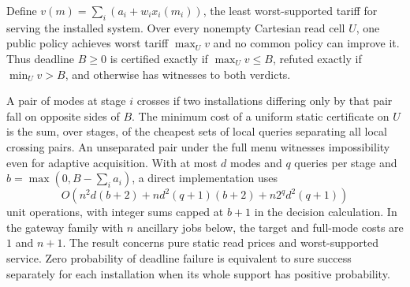 \begin{theorem}\label{ext:t30s}

Define \(v(m)=\sum_i(a_i+w_ix_i(m_i))\), the least worst-supported tariff for serving the installed system. Over every nonempty Cartesian read cell \(U\), one public policy achieves worst tariff \(\max_Uv\) and no common policy can improve it. Thus deadline \(B\ge0\) is certified exactly if \(\max_Uv\le B\), refuted exactly if \(\min_Uv>B\), and otherwise has witnesses to both verdicts.

A pair of modes at stage \(i\) crosses if two installations differing only by that pair fall on opposite sides of \(B\). The minimum cost of a uniform static certificate on \(U\) is the sum, over stages, of the cheapest sets of local queries separating all local crossing pairs. An unseparated pair under the full menu witnesses impossibility even for adaptive acquisition. With at most \(d\) modes and \(q\) queries per stage and \(b=\max(0,B-\sum_i a_i)\), a direct implementation uses
\[
O\!\left(n^2d(b+2)+nd^2(q+1)(b+2)+n2^qd^2(q+1)\right)
\]
unit operations, with integer sums capped at \(b+1\) in the decision calculation. In the gateway family with \(n\) ancillary jobs below, the target and full-mode costs are \(1\) and \(n+1\). The result concerns pure static read prices and worst-supported service. Zero probability of deadline failure is equivalent to sure success separately for each installation when its whole support has positive probability.

\end{theorem}

